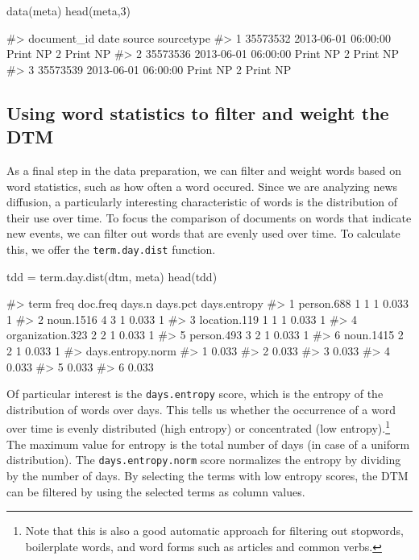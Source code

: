 \begin{Schunk}
\begin{Sinput}
data(meta)
head(meta,3)
\end{Sinput}
\begin{Soutput}
#>   document_id                date     source sourcetype
#> 1    35573532 2013-06-01 06:00:00 Print NP 2   Print NP
#> 2    35573536 2013-06-01 06:00:00 Print NP 2   Print NP
#> 3    35573539 2013-06-01 06:00:00 Print NP 2   Print NP
\end{Soutput}
\end{Schunk}

\subsection{Using word statistics to filter and weight the
DTM}\label{using-word-statistics-to-filter-and-weight-the-dtm}

As a final step in the data preparation, we can filter and weight words
based on word statistics, such as how often a word occured. Since we are
analyzing news diffusion, a particularly interesting characteristic of
words is the distribution of their use over time. To focus the
comparison of documents on words that indicate new events, we can filter
out words that are evenly used over time. To calculate this, we offer
the \texttt{term.day.dist} function.

\begin{Schunk}
\begin{Sinput}
tdd = term.day.dist(dtm, meta)
head(tdd)
\end{Sinput}
\begin{Soutput}
#>               term freq doc.freq days.n days.pct days.entropy
#> 1       person.688    1        1      1    0.033            1
#> 2        noun.1516    4        3      1    0.033            1
#> 3     location.119    1        1      1    0.033            1
#> 4 organization.323    2        2      1    0.033            1
#> 5       person.493    3        2      1    0.033            1
#> 6        noun.1415    2        2      1    0.033            1
#>   days.entropy.norm
#> 1             0.033
#> 2             0.033
#> 3             0.033
#> 4             0.033
#> 5             0.033
#> 6             0.033
\end{Soutput}
\end{Schunk}

Of particular interest is the \texttt{days.entropy} score, which is the
entropy of the distribution of words over days. This tells us whether
the occurrence of a word over time is evenly distributed (high entropy)
or concentrated (low entropy).\footnote{Note that this is also a good
  automatic approach for filtering out stopwords, boilerplate words, and
  word forms such as articles and common verbs.} The maximum value for
entropy is the total number of days (in case of a uniform distribution).
The \texttt{days.entropy.norm} score normalizes the entropy by dividing
by the number of days. By selecting the terms with low entropy scores,
the DTM can be filtered by using the selected terms as column values.

